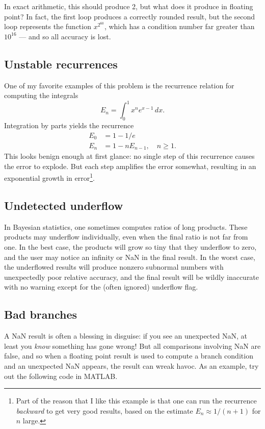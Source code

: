 \documentclass[12pt, leqno]{article} %
\begin{document}
In exact arithmetic, this should produce 2, but what does it produce
in floating point?  In fact, the first loop produces a correctly
rounded result, but the second loop represents the function
$x^{2^{60}}$, which has a condition number far greater than $10^{16}$
--- and so all accuracy is lost.

\subsection{Unstable recurrences}

One of my favorite examples of this problem is the recurrence relation
for computing the integrals
\[
  E_n = \int_{0}^1 x^n e^{x-1} \, dx.
\]
Integration by parts yields the recurrence
\begin{align*}
  E_0 &= 1-1/e \\
  E_n &= 1-nE_{n-1}, \quad n \geq 1.
\end{align*}
This looks benign enough at first glance: no single step of
this recurrence causes the error to explode.  But
each step amplifies the error somewhat, resulting in an exponential
growth in error\footnote{%
Part of the reason that I like this example is that one can
run the recurrence {\em backward} to get very good results,
based on the estimate $E_n \approx 1/(n+1)$ for $n$ large.
}.

\subsection{Undetected underflow}

In Bayesian statistics, one sometimes computes ratios of long
products.  These products may underflow individually, even when the
final ratio is not far from one.  In the best case, the products will
grow so tiny that they underflow to zero, and the user may notice an
infinity or NaN in the final result.  In the worst case, the
underflowed results will produce nonzero subnormal numbers with
unexpectedly poor relative accuracy, and the final result will be
wildly inaccurate with no warning except for the (often ignored)
underflow flag.

\subsection{Bad branches}

A NaN result is often a blessing in disguise: if you see an
unexpected NaN, at least you {\em know} something has gone wrong!
But all comparisons involving NaN are false,  and so
when a floating point result is used to compute a branch condition
and an unexpected NaN appears, the result can wreak havoc.
As an example, try out the following code in MATLAB.
\end{document}
